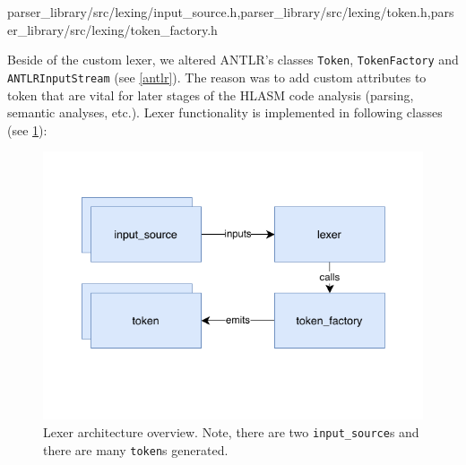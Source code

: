 {parser\_library/src/lexing/input\_source.h,parser\_library/src/lexing/token.h,parser\_library/src/lexing/token\_factory.h}

Beside of the custom lexer, we altered ANTLR's classes \texttt{Token}, \texttt{TokenFactory} and \texttt{ANTLRInputStream} (see \cref{antlr}). The reason was to add custom attributes to token that are vital for later stages of the HLASM code analysis (parsing, semantic analyses, etc.). Lexer functionality is implemented in following classes (see \cref{lexer_arch}):

\begin{figure}
	\centering
	\includegraphics{img/lexer_arch}
	\caption{Lexer architecture overview. Note, there are two \texttt{input\_source}s and there are many \texttt{token}s
		\label{lexer_arch} generated.}
\end{figure}

